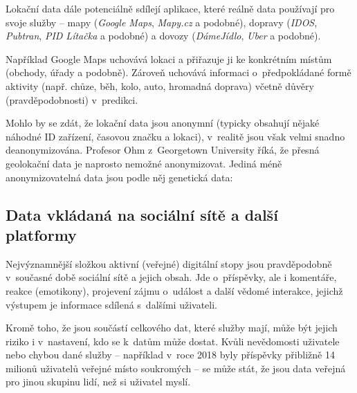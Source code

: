 Lokační data dále potenciálně sdílejí aplikace, které reálně data používají pro svoje služby -- mapy (\textit{Google Maps}, \textit{Mapy.cz} a podobné), dopravy (\textit{IDOS}, \textit{Pubtran}, \textit{PID Lítačka} a podobné) a dovozy (\textit{DámeJídlo}, \textit{Uber}  a podobné).

Například Google Maps uchovává lokaci a přiřazuje ji ke konkrétním místům (obchody, úřady a podobně). Zároveň uchovává informaci o~předpokládané formě aktivity (např. chůze, běh, kolo, auto, hromadná doprava) včetně důvěry (pravděpodobnosti) v~predikci.

Mohlo by se zdát, že lokační data jsou anonymní (typicky obsahují nějaké náhodné ID zařízení, časovou značku a lokaci), v~realitě jsou však velmi snadno deanonymizována. Profesor Ohm z~Georgetown University říká, že přesná geolokační data je naprosto nemožné anonymizovat. Jediná méně anonymizovatelná data jsou podle něj genetická data:

\begin{displayquote}
	\citep{location-data}
\end{displayquote}

\subsection{Data vkládaná na sociální sítě a další platformy}
Nejvýznamnější složkou aktivní (veřejné) digitální stopy jsou pravděpodobně v~současné době sociální sítě a jejich obsah.
Jde o~příspěvky, ale i komentáře, reakce (emotikony), projevení zájmu o~událost a další vědomé interakce, jejichž výstupem je informace sdílená s~dalšími uživateli. 

Kromě toho, že jsou součástí celkového  dat, které služby mají, může být jejich riziko i v~nastavení, kdo se k~datům může dostat.
Kvůli nevědomosti uživatele nebo chybou dané služby -- například v~roce 2018 byly příspěvky přibližně 14 milionů uživatelů veřejné místo soukromých \citep{facebook-public-posts} -- se může stát, že jsou data veřejná pro jinou skupinu lidí, než si uživatel myslí. 

